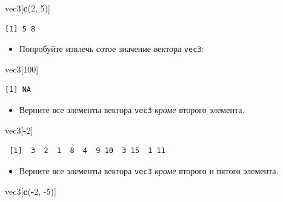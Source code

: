 \documentclass[
]{book}
\newenvironment{Shaded}{\begin{snugshade}}{\end{snugshade}}
\newcommand{\DecValTok}[1]{\textcolor[rgb]{0.00,0.00,0.81}{#1}}
\newcommand{\KeywordTok}[1]{\textcolor[rgb]{0.13,0.29,0.53}{\textbf{#1}}}
\newcommand{\NormalTok}[1]{#1}
\newcommand{\OperatorTok}[1]{\textcolor[rgb]{0.81,0.36,0.00}{\textbf{#1}}}
\providecommand{\tightlist}{%
  \setlength{\itemsep}{0pt}\setlength{\parskip}{0pt}}
\begin{document}
\begin{Shaded}
\begin{Highlighting}[]
\NormalTok{vec3[}\KeywordTok{c}\NormalTok{(}\DecValTok{2}\NormalTok{, }\DecValTok{5}\NormalTok{)]}
\end{Highlighting}
\end{Shaded}

\begin{verbatim}
[1] 5 8
\end{verbatim}

\begin{itemize}
\tightlist
\item
  Попробуйте извлечь сотое значение вектора \texttt{vec3}:
\end{itemize}

\begin{Shaded}
\begin{Highlighting}[]
\NormalTok{vec3[}\DecValTok{100}\NormalTok{]}
\end{Highlighting}
\end{Shaded}

\begin{verbatim}
[1] NA
\end{verbatim}

\begin{itemize}
\tightlist
\item
  Верните все элементы вектора \texttt{vec3} \emph{кроме} второго элемента.
\end{itemize}

\begin{Shaded}
\begin{Highlighting}[]
\NormalTok{vec3[}\OperatorTok{-}\DecValTok{2}\NormalTok{]}
\end{Highlighting}
\end{Shaded}

\begin{verbatim}
 [1]  3  2  1  8  4  9 10  3 15  1 11
\end{verbatim}

\begin{itemize}
\tightlist
\item
  Верните все элементы вектора \texttt{vec3} \emph{кроме} второго и пятого элемента.
\end{itemize}

\begin{Shaded}
\begin{Highlighting}[]
\NormalTok{vec3[}\KeywordTok{c}\NormalTok{(}\OperatorTok{-}\DecValTok{2}\NormalTok{, }\DecValTok{-5}\NormalTok{)]}
\end{Highlighting}
\end{Shaded}
\end{document}
